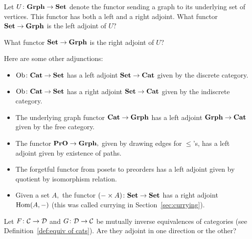 \documentclass[CT4S-EN-RU]{subfiles}
\begin{document}
\begin{exampleRUS}
\end{exampleRUS}

\begin{exerciseENG}
Let $U\colon{\mathbf{Grph}}\rightarrow{\mathbf{Set}}$ denote the functor sending a graph to its underlying set of vertices. This functor has both a left and a right adjoint. 
\sexc What functor ${\mathbf{Set}}\rightarrow{\mathbf{Grph}}$ is the left adjoint of $U?$
\item What functor ${\mathbf{Set}}\rightarrow{\mathbf{Grph}}$ is the right adjoint of $U?$
\endsexc
\end{exerciseENG}

\begin{exerciseRUS}
\end{exerciseRUS}

\begin{exampleENG}\label{ex:other adjunctions}
Here are some other adjunctions:

\begin{itemize}
\item $\operatorname{Ob}\colon{\mathbf{Cat}}\rightarrow{\mathbf{Set}}$ has a left adjoint ${\mathbf{Set}}\rightarrow{\mathbf{Cat}}$ given by the discrete category.
\item $\operatorname{Ob}\colon{\mathbf{Cat}}\rightarrow{\mathbf{Set}}$ has a right adjoint ${\mathbf{Set}}\rightarrow{\mathbf{Cat}}$ given by the indiscrete category.
\item The underlying graph functor ${\mathbf{Cat}}\rightarrow{\mathbf{Grph}}$ has a left adjoint ${\mathbf{Grph}}\rightarrow{\mathbf{Cat}}$ given by the free category.
\item The functor ${\mathbf{PrO}}\rightarrow{\mathbf{Grph}},$  given by drawing edges for $\leq$'s, has a left adjoint given by existence of paths.
\item The forgetful functor from posets to preorders has a left adjoint given by quotient by isomorphism relation.
\item Given a set $A,$ the functor $(-\times A)\colon{\mathbf{Set}}\rightarrow{\mathbf{Set}}$ has a right adjoint $\operatorname{Hom}(A,-)$ (this was called currying in Section~\ref{sec:currying}). 
\end{itemize}
\end{exampleENG}

\begin{exampleRUS}\label{ex:other adjunctions}
\end{exampleRUS}

\begin{exerciseENG}
Let $F\colon\mathcal{C}\rightarrow\mathcal{D}$ and $G\colon\mathcal{D}\rightarrow\mathcal{C}$ be mutually inverse equivalences of categories (see Definition~\ref{def:equiv of cats}). Are they adjoint in one direction or the other?
\end{exerciseENG}
\end{document}
